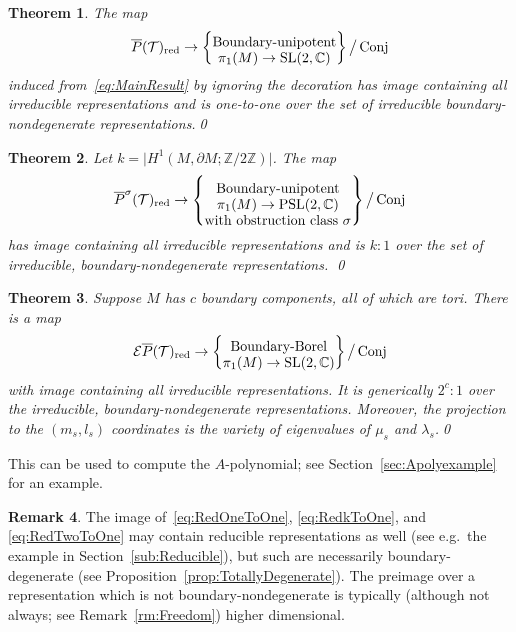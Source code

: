 \documentclass[11pt]{amsart}
\theoremstyle{plain}
\newtheorem{theorem}{Theorem}[section]
\theoremstyle{definition}
\newtheorem{remark}[theorem]{Remark}
\numberwithin{equation}{section}
\newcommand{\Z}{\mathbb Z}
\newcommand{\C}{\mathbb C}
\newcommand{\T}{\mathcal T}
\newcommand{\E}{\mathcal E}
\DeclareMathOperator{\PSL}{PSL}
\DeclareMathOperator{\SL}{SL}
\DeclareMathOperator{\Conj}{Conj}
\DeclareMathOperator{\red}{red}
\begin{document}
\begin{theorem}\label{thm:OneToOneOverNonDegenerate}
The map
\begin{equation}\label{eq:RedOneToOne}
\overline P(\T)_{\red}\to\left\{\txt{Boundary-unipotent\\$\pi_1(M)\to\SL(2,\C)$}\right\}\big/\Conj
\end{equation}
induced from~\eqref{eq:MainResult} by ignoring the decoration has image containing all irreducible representations and is one-to-one over the set of irreducible boundary-nondegenerate representations.\qed
\end{theorem}



\begin{theorem}\label{thm:MainThmPSL}
Let $k=\big\vert H^1(M,\partial M;\Z/2\Z)\big\vert$. The map
\begin{equation}\label{eq:RedkToOne}
\overline P^\sigma(\T)_{\red}\to\left\{\txt{Boundary-unipotent\\$\pi_1(M)\to\PSL(2,\C)$\\with obstruction class $\sigma$}\right\}\big/\Conj
\end{equation}
has image containing all irreducible representations and is $k:1$ over the set of irreducible, boundary-nondegenerate representations. \qed
\end{theorem}


 
\begin{theorem}\label{thm:MainThmEnhanced}
Suppose $M$ has $c$ boundary components, all of which are tori. There is a map
\begin{equation}\label{eq:RedTwoToOne}
\E \overline P(\T)_{\red}\to\left\{\txt{Boundary-Borel\\$\pi_1(M)\to\SL(2,\C)$}\right\}\big/\Conj
\end{equation}
with image containing all irreducible representations. It is generically $2^c:1$ over the irreducible, boundary-nondegenerate representations. 
Moreover, the projection to the $(m_s,l_s)$ coordinates is the variety of eigenvalues of $\mu_s$ and $\lambda_s$.\qed
\end{theorem}

This can be used to compute the $A$-polynomial; see Section~\ref{sec:Apolyexample} for an example.




\begin{remark}
The image of~\eqref{eq:RedOneToOne}, \eqref{eq:RedkToOne}, and \eqref{eq:RedTwoToOne} may contain reducible representations as well (see e.g.~the example in Section~\ref{sub:Reducible}), but such are necessarily boundary-degenerate (see Proposition~\ref{prop:TotallyDegenerate}). The preimage over a representation which is not boundary-nondegenerate is typically (although not always; see Remark~\ref{rm:Freedom}) higher dimensional.
\end{remark}
\end{document}

